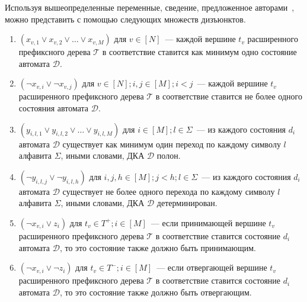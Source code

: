 Используя вышеопределенные переменные, сведение, предложенное авторами~\cite{heule-icgi10}, можно представить с помощью следующих множеств дизъюнктов.



\begin{enumerate}
  \item $\left(x_{v,1} \vee x_{v,2} \vee \ldots \vee x_{v,M}\right)$ для $v \in \left[N\right]$~{---} каждой вершине $t_{v}$ расширенного префиксного дерева $\mathcal{T} $ в соответствие ставится как минимум одно состояние автомата $\mathcal{D}$.
  \item $\left(\neg x_{v,i} \vee \neg x_{v,j}\right)$ для $v \in \left[N\right]; i,j \in \left[M\right]; i < j$~{---} каждой вершине $t_{v}$ расширенного префиксного дерева $\mathcal{T} $ в соответствие ставится не более одного состояния автомата $\mathcal{D}$.
  \item $\left(y_{i,l,1} \vee y_{i,l,2} \vee \ldots \vee y_{i,l,M}\right)$ для $i \in \left[M\right]; l \in \Sigma$~{---} из каждого состояния $d_{i}$ автомата $\mathcal{D}$ существует как минимум один переход по каждому символу $l$ алфавита $\Sigma$, иными словами, ДКА $\mathcal{D}$ полон.
  \item $\left(\neg y_{i,l,j} \vee \neg y_{i,l,h}\right)$ для $i,j,h \in \left[M\right]; j < h; l \in \Sigma$~{---} из каждого состояния $d_{i}$ автомата $\mathcal{D}$ существует не более одного перехода по каждому символу $l$ алфавита $\Sigma$, иными словами, ДКА $\mathcal{D}$ детерминирован.
  \item $\left(\neg x_{v,i} \vee z_{i}\right)$ для $t_{v} \in T^{+}; i \in \left[M\right]$~{---} если принимающей вершине $t_{v}$ расширенного префиксного дерева $\mathcal{T}$ в соответствие ставится состояние $d_{i}$ автомата $\mathcal{D}$, то это состояние также должно быть принимающим.
  \item $\left(\neg x_{v,i} \vee \neg z_{i}\right)$ для $t_{v} \in T^{-}; i \in \left[M\right]$~{---} если отвергающей вершине $t_{v}$ расширенного префиксного дерева $\mathcal{T}$ в соответствие ставится состояние $d_{i}$ автомата $\mathcal{D}$, то это состояние также должно быть отвергающим.

\end{enumerate}
